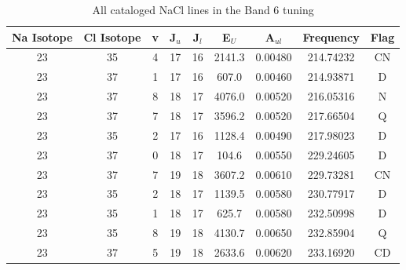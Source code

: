 \begin{table*}[htp]
\centering
\caption{All cataloged NaCl lines in the Band 6 tuning}
\begin{tabular}{ccccccccc}
\label{tab:Na_detections_B6}
Na Isotope & Cl Isotope & v & J$_u$ & J$_l$ & E$_U$ & A$_{ul}$ & Frequency & Flag \\
\hline
23 & 35 & 4 & 17 & 16 & 2141.3 & 0.00480 & 214.74232 & CN \\
23 & 37 & 1 & 17 & 16 & 607.0 & 0.00460 & 214.93871 & D \\
23 & 37 & 8 & 18 & 17 & 4076.0 & 0.00520 & 216.05316 & N \\
23 & 37 & 7 & 18 & 17 & 3596.2 & 0.00520 & 217.66504 & Q \\
23 & 35 & 2 & 17 & 16 & 1128.4 & 0.00490 & 217.98023 & D \\
23 & 37 & 0 & 18 & 17 & 104.6 & 0.00550 & 229.24605 & D \\
23 & 37 & 7 & 19 & 18 & 3607.2 & 0.00610 & 229.73281 & CN \\
23 & 35 & 2 & 18 & 17 & 1139.5 & 0.00580 & 230.77917 & D \\
23 & 35 & 1 & 18 & 17 & 625.7 & 0.00580 & 232.50998 & D \\
23 & 35 & 8 & 19 & 18 & 4130.7 & 0.00650 & 232.85904 & Q \\
23 & 37 & 5 & 19 & 18 & 2633.6 & 0.00620 & 233.16920 & CD \\
\hline
\end{tabular}

\par 
\end{table*}
